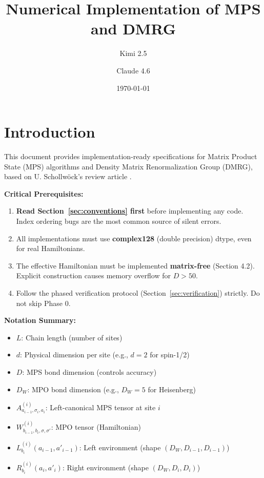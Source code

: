 \documentclass[aps,prb,onecolumn,scriptaddress]{revtex4-2}
\begin{document}
	
	\title{Numerical Implementation of MPS and DMRG}
	\author{Kimi 2.5}
	\author{Claude 4.6}
	\date{\today}
	\maketitle
	
	\section{Introduction}
	
	This document provides implementation-ready specifications for Matrix Product State (MPS) algorithms and Density Matrix Renormalization Group (DMRG), based on U. Schollwöck's review article \cite{schollwoeck2011}. 
	
	\textbf{Critical Prerequisites:}
	\begin{enumerate}
		\item \textbf{Read Section~\ref{sec:conventions} first} before implementing any code. Index ordering bugs are the most common source of silent errors.
		\item All implementations must use \textbf{complex128} (double precision) dtype, even for real Hamiltonians.
		\item The effective Hamiltonian must be implemented \textbf{matrix-free} (Section 4.2). Explicit construction causes memory overflow for $D > 50$.
		\item Follow the phased verification protocol (Section~\ref{sec:verification}) strictly. Do not skip Phase 0.
	\end{enumerate}
	
	\textbf{Notation Summary:}
	\begin{itemize}
		\item $L$: Chain length (number of sites)
		\item $d$: Physical dimension per site (e.g., $d=2$ for spin-1/2)
		\item $D$: MPS bond dimension (controls accuracy)
		\item $D_W$: MPO bond dimension (e.g., $D_W=5$ for Heisenberg)
		\item $A^{(i)}_{a_{i-1},\sigma_i,a_i}$: Left-canonical MPS tensor at site $i$
		\item $W^{(i)}_{b_{i-1},b_i,\sigma,\sigma'}$: MPO tensor (Hamiltonian)
		\item $L^{(i)}_{b_i}(a_{i-1}, a'_{i-1})$: Left environment (shape $(D_W, D_{i-1}, D_{i-1})$)
		\item $R^{(i)}_{b_i}(a_i, a'_i)$: Right environment (shape $(D_W, D_i, D_i)$)
	\end{itemize}
	
\end{document}
